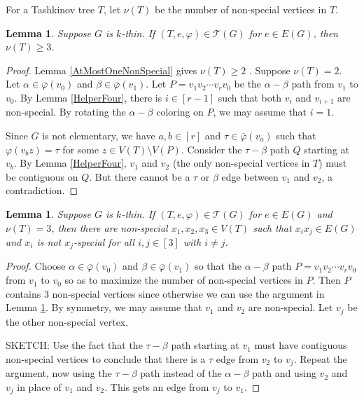 \documentclass[12pt]{amsart}
\theoremstyle{plain}
\newtheorem{lem}[thm]{Lemma}
\theoremstyle{definition}
\theoremstyle{remark}
\newcommand{\fancy}[1]{\mathcal{#1}}
\newcommand{\T}{\fancy{T}}
\newcommand{\irange}[1]{\left[#1\right]}
\newcommand{\vph}{\varphi}
\newcommand{\vphn}{\overline{\varphi}}
\begin{document}
For a Tashkinov tree $T$, let $\nu(T)$ be the number of non-special vertices in $T$.
\begin{lem}\label{HelperFive}
Suppose $G$ is $k$-thin. If $(T, e, \vph) \in \T(G)$ for $e \in E(G)$, then $\nu(T) \ge 3$.
\end{lem}
\begin{proof}
Lemma \ref{AtMostOneNonSpecial} gives $\nu(T) \ge 2$ .  Suppose $\nu(T) = 2$.  
Let $\alpha \in \vphn(v_0)$ and $\beta \in \vphn(v_1)$.  Let $P = v_1v_2\cdots v_rv_0$ be the $\alpha-\beta$ path from $v_1$ to $v_0$.
By Lemma \ref{HelperFour}, there is $i \in \irange{r-1}$ such that both $v_i$ and $v_{i+1}$ are non-special.  By rotating the $\alpha-\beta$ coloring on $P$, we may assume that $i=1$.

Since $G$ is not elementary, we have $a,b \in \irange{r}$ and $\tau \in \vphn(v_a)$ such that $\vph(v_bz) = \tau$ for some $z \in V(T) \setminus V(P)$.  
Consider the $\tau-\beta$ path $Q$ starting at $v_b$.  By Lemma \ref{HelperFour}, $v_1$ and $v_2$ (the only non-special vertices in $T$) must be contiguous on $Q$.  
But there cannot be a $\tau$ or $\beta$ edge between $v_1$ and $v_2$, a contradiction.
\end{proof}

\begin{lem}\label{HelperSix}
Suppose $G$ is $k$-thin. If $(T, e, \vph) \in \T(G)$ for $e \in E(G)$ and $\nu(T) = 3$, then there are non-special $x_1,x_2,x_3 \in V(T)$ such that $x_ix_j \in E(G)$ and $x_i$ is not $x_j$-special for all $i,j \in \irange{3}$ with $i \ne j$.
\end{lem}
\begin{proof}
Choose $\alpha \in \vphn(v_0)$ and $\beta \in \vphn(v_1)$ so that the $\alpha-\beta$ path $P = v_1v_2\cdots v_rv_0$ from $v_1$ to $v_0$ so as to maximize the number of non-special vertices in $P$.
Then $P$ contains $3$ non-special vertices since otherwise we can use the argument in Lemma \ref{HelperFive}.  By symmetry, we may assume that $v_1$ and $v_2$ are non-special.  Let $v_j$ be the other non-special vertex.  

SKETCH:  Use the fact that the $\tau-\beta$ path starting at $v_1$ must have contiguous non-special vertices to conclude that there is a $\tau$ edge from $v_2$ to $v_j$.  
Repeat the argument, now using the $\tau-\beta$ path instead of the $\alpha-\beta$ path and using $v_2$ and $v_j$ in place of $v_1$ and $v_2$.  This gets an edge from $v_j$ to $v_1$.
\end{proof}
\end{document}

